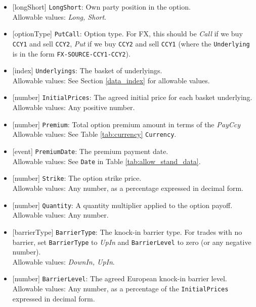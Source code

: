 \begin{itemize} 
  \item{}[longShort] \lstinline!LongShort!: Own party position in the option. \\
  Allowable values: \emph{Long, Short}.
  \item{}[optionType] \lstinline!PutCall!: Option type. For FX, this should be \emph{Call} if we buy
  \lstinline!CCY1! and sell \lstinline!CCY2!,
  \emph{Put} if we buy \lstinline!CCY2! and sell \lstinline!CCY1! (where the \lstinline!Underlying! is in the
  form \lstinline!FX-SOURCE-CCY1-CCY2!). \\
  \item{}[index] \lstinline!Underlyings!: The basket of underlyings. \\
  Allowable values: See Section \ref{data_index} for allowable values.
  \item{}[number] \lstinline!InitialPrices!: The agreed initial price for each basket underlying. \\
  Allowable values: Any positive number.
  \item{}[number] \lstinline!Premium!: Total option premium amount in terms of the \emph{PayCcy} \\
  Allowable values: See Table \ref{tab:currency} \lstinline!Currency!.
  \item{}[event] \lstinline!PremiumDate!: The premium payment date. \\
  Allowable values: See \lstinline!Date! in Table \ref{tab:allow_stand_data}.
  \item{}[number] \lstinline!Strike!: The option strike price. \\
  Allowable values: Any number, as a percentage expressed in decimal form.
  \item{}[number] \lstinline!Quantity!: A quantity multiplier applied to the option payoff. \\
  Allowable values: Any number.
  \item{}[barrierType] \lstinline!BarrierType!: The knock-in barrier type. For trades with no barrier,
  set \lstinline!BarrierType! to \emph{UpIn} and \lstinline!BarrierLevel! to zero (or any negative number). \\
  Allowable values: \emph{DownIn, UpIn}.
  \item{}[number] \lstinline!BarrierLevel!: The agreed European knock-in barrier level. \\
  Allowable values: Any number, as a percentage of the \lstinline!InitialPrices! expressed in decimal form.

\end{itemize}

